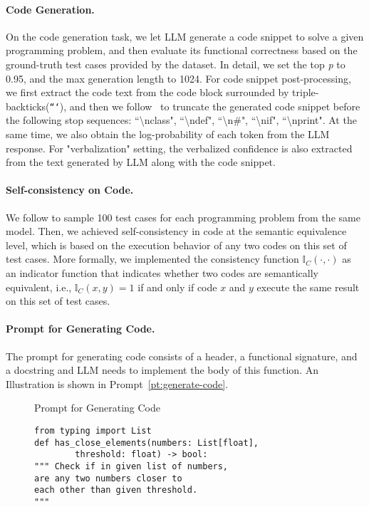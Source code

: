 \paragraph{Code Generation.} 
On the code generation task, we let LLM generate a code snippet to solve a given programming problem, and then evaluate its functional correctness based on the ground-truth test cases provided by the dataset. In detail, we set the top \textit{p} to 0.95, and the max generation length to 1024. For code snippet post-processing, we first extract the code text from the code block surrounded by triple-backticks(\texttt{```}), and then we follow~\citet{Codex2021} to truncate the generated code snippet before the following stop sequences: ``\textbackslash nclass", ``\textbackslash ndef", ``\textbackslash n\#", ``\textbackslash nif", ``\textbackslash nprint". At the same time, we also obtain the log-probability of each token from the LLM response. For "verbalization" setting, the verbalized confidence is also extracted from the text generated by LLM along with the code snippet. 

\paragraph{Self-consistency on Code.}
We follow \citet{chen2022codet} to sample 100 test cases for each programming problem from the same model. Then, we achieved self-consistency in code at the semantic equivalence level, which is based on the execution behavior of any two codes on this set of test cases. More formally, we implemented the consistency function $\mathbb{I}_C(\cdot,\cdot)$ as an indicator function that indicates whether two codes are semantically equivalent, i.e., $\mathbb{I}_C(x,y) = 1$ if and only if code $x$ and $y$ execute the same result on this set of test cases.

\paragraph{Prompt for Generating Code.}
The prompt for generating code consists of a header, a functional signature, and a docstring and LLM needs to implement the body of this function. An Illustration is shown in Prompt~\ref{pt:generate-code}.

\begin{figure}[ht]
\begin{promptbox}[label=pt:generate-code]{Prompt for Generating Code}
\begin{lstlisting}
from typing import List
def has_close_elements(numbers: List[float], 
        threshold: float) -> bool:
""" Check if in given list of numbers, 
are any two numbers closer to
each other than given threshold.
"""\end{lstlisting}
\end{promptbox}
\end{figure}

